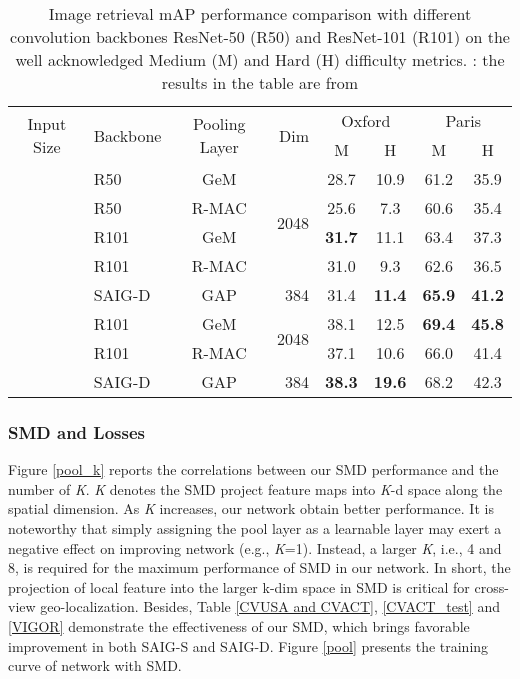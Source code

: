 \documentclass[sn-basic,iicol]{sn-jnl}
\theoremstyle{thmstyletwo}\newtheorem{example}{Example}\newtheorem{remark}{Remark}
\theoremstyle{thmstylethree}\newtheorem{definition}{Definition}
\begin{document}
 
 \begin{table*}
\setlength{\abovecaptionskip}{0.2cm}
\centering
\begin{tabular}{clc|r|cccc}
\toprule
\multirow{2}{*}{Input Size} & \multirow{2}{*}{Backbone} & \multirow{2}{*}{Pooling Layer} & \multirow{2}{*}{Dim} & \multicolumn{2}{c}{Oxford} & \multicolumn{2}{c}{Paris}\\ \cmidrule{5-8}
~&~&~ &~&M&\multicolumn{1}{c|}{H}&M&H\\ \midrule 
\multirow{5}{*}{}&R50&GeM&\multirow{4}{*}{2048}&28.7&\multicolumn{1}{c|}{10.9}&61.2&35.9 \\
~&R50&R-MAC&~&25.6&\multicolumn{1}{c|}{7.3}&60.6&35.4 \\
~&R101&GeM&~&\textbf{31.7}&\multicolumn{1}{c|}{11.1}&63.4&37.3 \\
~&R101&R-MAC&~&31.0&\multicolumn{1}{c|}{9.3}&62.6&36.5 \\
~&SAIG-D&GAP&384& 31.4&\multicolumn{1}{c|}{\textbf{11.4}}& \textbf{65.9}& \textbf{41.2}\\ \midrule
\multirow{3}{*}{}&R101&GeM&\multirow{2}{*}{2048}&38.1&\multicolumn{1}{c|}{12.5}&\textbf{69.4}&\textbf{45.8} \\
~&R101&R-MAC&~&37.1&\multicolumn{1}{c|}{10.6}& 66.0& 41.4 \\
~&SAIG-D&GAP&384& \textbf{38.3}&\multicolumn{1}{c|}{\textbf{19.6}} &68.2 &42.3  \\
\bottomrule
\end{tabular}
\caption{Image retrieval mAP performance comparison with different convolution backbones ResNet-50 (R50) and ResNet-101 (R101) on the well acknowledged Medium (M) and Hard (H) difficulty metrics. : the results in the table are from \protect\citep{TrainViTforImageRetri}}
\label{Image retrieval}
\end{table*}
 
\subsubsection{SMD and Losses} Figure \ref{pool_k} reports the correlations between our SMD performance and the number of \emph{K}. \emph{K} denotes the SMD project feature maps into \emph{K}-d space along the spatial dimension. 
As \emph{K} increases, our network obtain better performance. It is noteworthy that simply assigning the pool layer as a learnable layer may exert a negative effect on improving network (e.g., \emph{K}=1). Instead, a larger \emph{K}, i.e., 4 and 8, is required for the maximum performance of SMD in our network. In short, the projection of local feature into the larger k-dim space in SMD is critical for cross-view geo-localization. Besides, Table \ref{CVUSA and CVACT}, \ref{CVACT_test} and \ref{VIGOR} demonstrate the effectiveness of our SMD, which brings favorable improvement in both SAIG-S and SAIG-D. Figure \ref{pool} presents the training curve of network with SMD.
\end{document}
